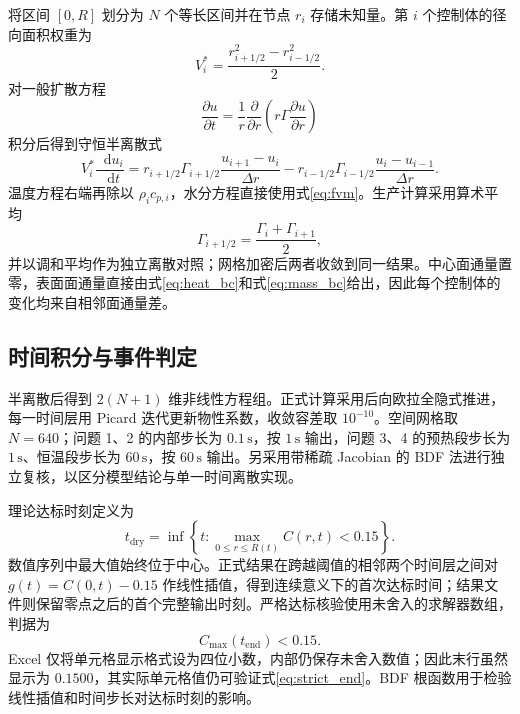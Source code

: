\documentclass[UTF8,a4paper,zihao=-4,fontset=fandol]{ctexart}
\newcommand{\unit}[1]{\,\mathrm{#1}}
\newcommand{\dif}{\mathop{}\!\mathrm{d}}
\begin{document}
将区间 $[0,R]$ 划分为 $N$ 个等长区间并在节点 $r_i$ 存储未知量。第 $i$ 个控制体的径向面积权重为
\begin{equation}
V_i^{\ast}=\frac{r_{i+1/2}^2-r_{i-1/2}^2}{2}.
\label{eq:volume}
\end{equation}
对一般扩散方程
\begin{equation}
\frac{\partial u}{\partial t}
=\frac{1}{r}\frac{\partial}{\partial r}
\left(r\Gamma\frac{\partial u}{\partial r}\right)
\end{equation}
积分后得到守恒半离散式\cite{patankar1980}
\begin{equation}
V_i^{\ast}\frac{\dif u_i}{\dif t}
=r_{i+1/2}\Gamma_{i+1/2}\frac{u_{i+1}-u_i}{\Delta r}
-r_{i-1/2}\Gamma_{i-1/2}\frac{u_i-u_{i-1}}{\Delta r}.
\label{eq:fvm}
\end{equation}
温度方程右端再除以 $\rho_i c_{p,i}$，水分方程直接使用式\eqref{eq:fvm}。生产计算采用算术平均
\begin{equation}
\Gamma_{i+1/2}=\frac{\Gamma_i+\Gamma_{i+1}}{2},
\label{eq:hmean}
\end{equation}
并以调和平均作为独立离散对照；网格加密后两者收敛到同一结果。中心面通量置零，表面面通量直接由式\eqref{eq:heat_bc}和式\eqref{eq:mass_bc}给出，因此每个控制体的变化均来自相邻面通量差。

\subsection{时间积分与事件判定}

半离散后得到 $2(N+1)$ 维非线性方程组。正式计算采用后向欧拉全隐式推进，每一时间层用 Picard 迭代更新物性系数，收敛容差取 $10^{-10}$。空间网格取 $N=640$；问题 1、2 的内部步长为 $0.1\unit{s}$，按 $1\unit{s}$ 输出，问题 3、4 的预热段步长为 $1\unit{s}$、恒温段步长为 $60\unit{s}$，按 $60\unit{s}$ 输出。另采用带稀疏 Jacobian 的 BDF 法\cite{hairer1996,virtanen2020}进行独立复核，以区分模型结论与单一时间离散实现。

理论达标时刻定义为
\begin{equation}
t_{\mathrm{dry}}=\inf\left\{t:\max_{0\le r\le R(t)}C(r,t)<0.15\right\}.
\label{eq:drytime}
\end{equation}
数值序列中最大值始终位于中心。正式结果在跨越阈值的相邻两个时间层之间对 $g(t)=C(0,t)-0.15$ 作线性插值，得到连续意义下的首次达标时间；结果文件则保留零点之后的首个完整输出时刻。严格达标核验使用未舍入的求解器数组，判据为
\begin{equation}
C_{\max}(t_{\mathrm{end}})<0.15.
\label{eq:strict_end}
\end{equation}
Excel 仅将单元格显示格式设为四位小数，内部仍保存未舍入数值；因此末行虽然显示为 $0.1500$，其实际单元格值仍可验证式\eqref{eq:strict_end}。BDF 根函数用于检验线性插值和时间步长对达标时刻的影响。
\end{document}
